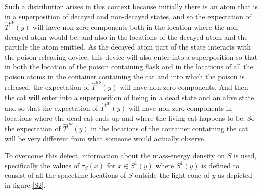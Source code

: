   Such a distribution arises in this context because initially there is an atom that is in a superposition of decayed and non-decayed states, and so the expectation of $\hat{T}^{\mu\nu}(y)$ will have non-zero components both in the location where the non-decayed atom would be, and also in the locations of the decayed atom and the particle the atom emitted. As the decayed atom part of the state interacts with the poison releasing device, this device will also enter into a superposition so that in both the location of the poison containing flask and in the locations of all the poison atoms in the container containing the cat and into which the poison is released, the expectation of $\hat{T}^{\mu\nu}(y)$ will have non-zero components. And then the cat will enter into a superposition of being in a dead state and an alive state, and so that the expectation of $\hat{T}^{\mu\nu}(y)$ will have non-zero components in locations where the dead cat ends up and where the living cat happens to be. So the expectation of $\hat{T}^{\mu\nu}(y)$ in the locations of the container containing the cat will be very different from what someone would actually observe.


  To overcome this defect, information about the mass-energy density on $S$ is used, specifically the values of $\tau_S(x)$ for $x\in S^1(y)$ where  $S^1(y)$ is defined to consist of all the spacetime locations of $S$ outside the light cone of $y$ as depicted in figure \ref{S2}.  

